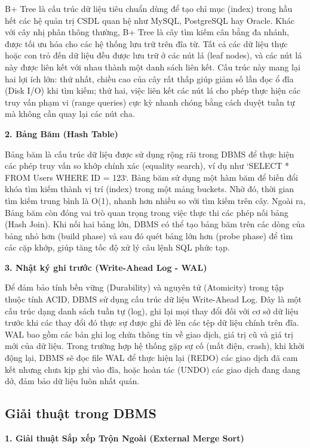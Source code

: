 \documentclass[a4paper,12pt]{article}
\begin{document}
B+ Tree là cấu trúc dữ liệu tiêu chuẩn dùng để tạo chỉ mục (index) trong hầu hết các hệ quản trị CSDL quan hệ như MySQL, PostgreSQL hay Oracle. Khác với cây nhị phân thông thường, B+ Tree là cây tìm kiếm cân bằng đa nhánh, được tối ưu hóa cho các hệ thống lưu trữ trên đĩa từ. Tất cả các dữ liệu thực hoặc con trỏ đến dữ liệu đều được lưu trữ ở các nút lá (leaf nodes), và các nút lá này được liên kết với nhau thành một danh sách liên kết. Cấu trúc này mang lại hai lợi ích lớn: thứ nhất, chiều cao của cây rất thấp giúp giảm số lần đọc ổ đĩa (Disk I/O) khi tìm kiếm; thứ hai, việc liên kết các nút lá cho phép thực hiện các truy vấn phạm vi (range queries) cực kỳ nhanh chóng bằng cách duyệt tuần tự mà không cần quay lại các nút cha.

\textbf{2. Bảng Băm (Hash Table)}

Bảng băm là cấu trúc dữ liệu được sử dụng rộng rãi trong DBMS để thực hiện các phép truy vấn so khớp chính xác (equality search), ví dụ như `SELECT * FROM Users WHERE ID = 123`. Bảng băm sử dụng một hàm băm để biến đổi khóa tìm kiếm thành vị trí (index) trong một mảng buckets. Nhờ đó, thời gian tìm kiếm trung bình là O(1), nhanh hơn nhiều so với tìm kiếm trên cây. Ngoài ra, Bảng băm còn đóng vai trò quan trọng trong việc thực thi các phép nối bảng (Hash Join). Khi nối hai bảng lớn, DBMS có thể tạo bảng băm trên các dòng của bảng nhỏ hơn (build phase) và sau đó quét bảng lớn hơn (probe phase) để tìm các cặp khớp, giúp tăng tốc độ xử lý câu lệnh SQL phức tạp.

\textbf{3. Nhật ký ghi trước (Write-Ahead Log - WAL)}

Để đảm bảo tính bền vững (Durability) và nguyên tử (Atomicity) trong tập thuộc tính ACID, DBMS sử dụng cấu trúc dữ liệu Write-Ahead Log. Đây là một cấu trúc dạng danh sách tuần tự (log), ghi lại mọi thay đổi đối với cơ sở dữ liệu trước khi các thay đổi đó thực sự được ghi đè lên các tệp dữ liệu chính trên đĩa. WAL bao gồm các bản ghi log chứa thông tin về giao dịch, giá trị cũ và giá trị mới của dữ liệu. Trong trường hợp hệ thống gặp sự cố (mất điện, crash), khi khởi động lại, DBMS sẽ đọc file WAL để thực hiện lại (REDO) các giao dịch đã cam kết nhưng chưa kịp ghi vào đĩa, hoặc hoàn tác (UNDO) các giao dịch đang dang dở, đảm bảo dữ liệu luôn nhất quán.

\subsection{Giải thuật trong DBMS}

\textbf{1. Giải thuật Sắp xếp Trộn Ngoài (External Merge Sort)}
\end{document}
